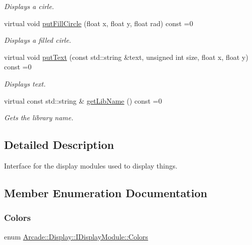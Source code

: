 \begin{DoxyCompactItemize}
\begin{DoxyCompactList}\small\item\em Displays a cirle. \end{DoxyCompactList}\item 
virtual void \mbox{\hyperlink{classArcade_1_1Display_1_1IDisplayModule_aa3d23b9294132b6efb28dbc932892d1b}{put\+Fill\+Circle}} (float x, float y, float rad) const =0
\begin{DoxyCompactList}\small\item\em Displays a filled cirle. \end{DoxyCompactList}\item 
virtual void \mbox{\hyperlink{classArcade_1_1Display_1_1IDisplayModule_a9740f30e3135d3a51851bdca07ef88a3}{put\+Text}} (const std\+::string \&text, unsigned int size, float x, float y) const =0
\begin{DoxyCompactList}\small\item\em Displays text. \end{DoxyCompactList}\item 
virtual const std\+::string \& \mbox{\hyperlink{classArcade_1_1Display_1_1IDisplayModule_a0d8e957815e94766bdefbd7a5043e81a}{get\+Lib\+Name}} () const =0
\begin{DoxyCompactList}\small\item\em Gets the library name. \end{DoxyCompactList}\end{DoxyCompactItemize}


\subsection{Detailed Description}
Interface for the display modules used to display things. 

\subsection{Member Enumeration Documentation}
\mbox{\label{classArcade_1_1Display_1_1IDisplayModule_ae0a776be9163d096051c522e21c007b2}} 
\subsubsection{\texorpdfstring{Colors}{Colors}}
{\footnotesize\ttfamily enum \mbox{\hyperlink{classArcade_1_1Display_1_1IDisplayModule_ae0a776be9163d096051c522e21c007b2}{Arcade\+::\+Display\+::\+I\+Display\+Module\+::\+Colors}}}



